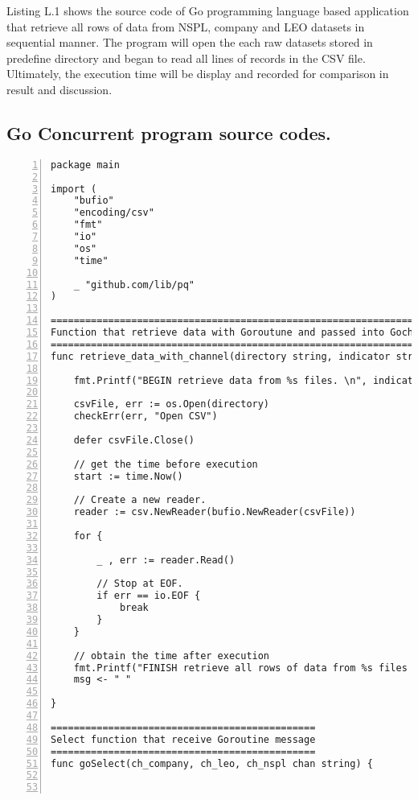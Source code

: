Listing L.1 shows the source code of Go programming language based application that retrieve all rows of data from NSPL, company and LEO datasets in sequential manner. The program will open the each raw datasets stored in predefine directory and began to read all lines of records in the CSV file. Ultimately, the execution time will be display and recorded for comparison in result and discussion. 

\newpage

\subsection{Go Concurrent program source codes.}

\lstset{basicstyle=\ttfamily\tiny}  
\begin{lstlisting}[breaklines, frame=single, numbers=left, caption={Go concurrent program source codes. (concurrent-csv.go)}, label=commandline-02]
package main 

import (
	"bufio"
	"encoding/csv"
	"fmt"
	"io"
	"os"
	"time"
	
	_ "github.com/lib/pq"
)

====================================================================
Function that retrieve data with Goroutune and passed into Gochannel 
====================================================================
func retrieve_data_with_channel(directory string, indicator string, msg chan string) {

	fmt.Printf("BEGIN retrieve data from %s files. \n", indicator);
	
	csvFile, err := os.Open(directory)
	checkErr(err, "Open CSV")
	
	defer csvFile.Close()
	
	// get the time before execution
	start := time.Now()
	
	// Create a new reader.
	reader := csv.NewReader(bufio.NewReader(csvFile))
	
	for {
		
		_ , err := reader.Read()
		
		// Stop at EOF.
		if err == io.EOF {
			break
		}
	}

	// obtain the time after execution
	fmt.Printf("FINISH retrieve all rows of data from %s files with %.5fs seconds.", indicator, time.Since(start).Seconds())
	msg <- " " 

}

==============================================
Select function that receive Goroutine message 
==============================================
func goSelect(ch_company, ch_leo, ch_nspl chan string) {



\end{lstlisting}
